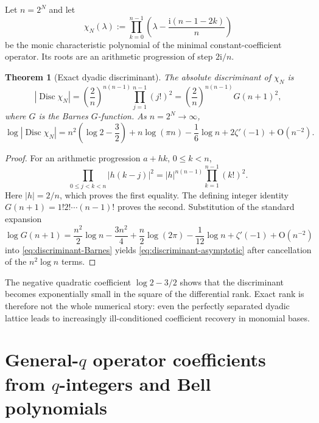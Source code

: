 \documentclass[11pt]{article}
\numberwithin{equation}{section}
\newtheorem{theorem}{Theorem}[section]
\theoremstyle{definition}
\theoremstyle{remark}
\DeclareMathOperator{\Disc}{Disc}
\newcommand{\ii}{\mathrm i}
\newcommand{\Oh}{\mathrm O}
\newcommand{\abs}[1]{\left\lvert#1\right\rvert}
\begin{document}
Let $n=2^N$ and let
\begin{equation}
 \chi_N(\lambda):=
 \prod_{k=0}^{n-1}
 \left(\lambda-\frac{\ii(n-1-2k)}{n}\right)
 \label{eq:dyadic-characteristic-poly}
\end{equation}
be the monic characteristic polynomial of the minimal constant-coefficient
operator.  Its roots are an arithmetic progression of step $2\ii/n$.

\begin{theorem}[Exact dyadic discriminant]
\label{thm:dyadic-discriminant}
The absolute discriminant of $\chi_N$ is
\begin{equation}
 \boxed{
 \abs{\Disc\chi_N}
 =\left(\frac{2}{n}\right)^{n(n-1)}
   \prod_{j=1}^{n-1}(j!)^2
 =\left(\frac{2}{n}\right)^{n(n-1)}G(n+1)^2,}
 \label{eq:discriminant-Barnes}
\end{equation}
where $G$ is the Barnes $G$-function.  As $n=2^N\to\infty$,
\begin{equation}
 \log\abs{\Disc\chi_N}
 =n^2\left(\log2-\frac32\right)
  +n\log(\pi n)-\frac16\log n+2\zeta'(-1)
  +\Oh(n^{-2}).
 \label{eq:discriminant-asymptotic}
\end{equation}
\end{theorem}
\begin{proof}
For an arithmetic progression $a+hk$, $0\le k<n$,
\[
 \prod_{0\le j<k<n}\abs{h(k-j)}^2
 =\abs h^{n(n-1)}\prod_{k=1}^{n-1}(k!)^2.
\]
Here $\abs h=2/n$, which proves the first equality.  The defining integer
identity $G(n+1)=1!2!\cdots(n-1)!$ proves the second.  Substitution of the
standard expansion
\[
 \log G(n+1)=\frac{n^2}{2}\log n-\frac{3n^2}{4}
 +\frac n2\log(2\pi)-\frac1{12}\log n+\zeta'(-1)
 +\Oh(n^{-2})
\]
into \eqref{eq:discriminant-Barnes} yields
\eqref{eq:discriminant-asymptotic} after cancellation of the $n^2\log n$
terms.
\end{proof}

The negative quadratic coefficient $\log2-3/2$ shows that the discriminant
becomes exponentially small in the square of the differential rank.  Exact
rank is therefore not the whole numerical story: even the perfectly separated
dyadic lattice leads to increasingly ill-conditioned coefficient recovery in
monomial bases.

\section{General-\texorpdfstring{$q$}{q} operator coefficients from \texorpdfstring{$q$}{q}-integers and Bell polynomials}
\label{sec:general-q-coefficients}
\end{document}
